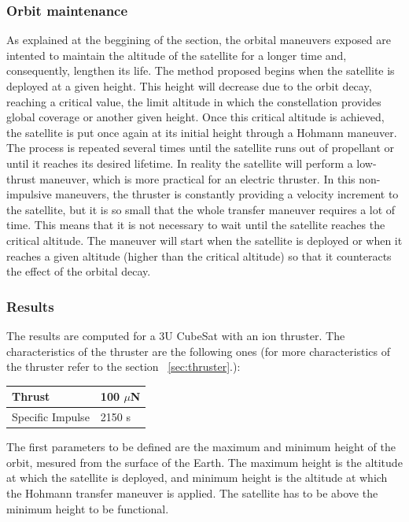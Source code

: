 \subsubsection{Orbit maintenance}
As explained at the beggining of the section, the orbital maneuvers exposed are intented to maintain the altitude of the satellite for a longer time and, consequently, lengthen its life.
The method proposed begins when the satellite is deployed at a given height. This height will decrease due to the orbit decay, reaching a critical value, the limit altitude in which the constellation provides global coverage or another given height. Once this critical altitude is achieved, the satellite is put once again at its initial height through a Hohmann maneuver.
The process is repeated several times until the satellite runs out of propellant or until it reaches its desired lifetime.
\newline
In reality the satellite will perform a low-thrust maneuver, which is more practical for an electric thruster. In this non-impulsive maneuvers, the thruster is constantly providing a velocity increment to the satellite, but it is so small that the whole transfer maneuver requires a lot of time. This means that it is not necessary to wait until the satellite reaches the critical altitude. The maneuver will start when the satellite is deployed or when it reaches a given altitude (higher than the critical altitude) so that it counteracts the effect of the orbital decay.

\subsubsection{Results}
The results are computed for a 3U CubeSat with an ion thruster. The characteristics of the thruster are the following ones (for more characteristics of the thruster refer to the section ~\ref{sec:thruster}.):

\begin{center}
\begin{tabular}{ | l | l | }
\hline
Thrust & 100 $\mu$N \\ 
\hline 
Specific Impulse & 2150 s \\
\hline
\end{tabular}
\end{center}

\noindent
The first parameters to be defined are the maximum and minimum height of the orbit, mesured from the surface of the Earth. The maximum height is the altitude at which the satellite is deployed, and minimum height is the altitude at which the Hohmann transfer maneuver is applied. The satellite has to be above the minimum height to be functional.

